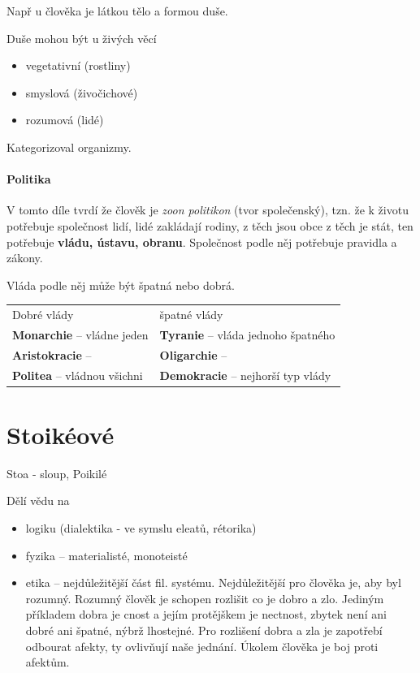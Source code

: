\documentclass[10pt,a4paper,
twoside,%
]{report}
\begin{document}
Např u člověka je látkou tělo a formou duše.

Duše mohou být u živých věcí  \begin{itemize}
\item vegetativní (rostliny)
\item smyslová (živočichové)
\item rozumová (lidé)
\end{itemize}
Kategorizoval organizmy.

\paragraph{Politika} V tomto díle tvrdí že člověk je \emph{zoon politikon} (tvor společenský), tzn. že k životu potřebuje společnost lidí, lidé zakládají rodiny, z těch jsou obce z těch je stát, ten potřebuje \textbf{vládu, ústavu, obranu}. Společnost podle něj potřebuje pravidla a zákony.

Vláda podle něj může být špatná nebo dobrá.
\begin{center}
\begin{tabular}{p{} p{}}
Dobré vlády &špatné vlády\\
\textbf{Monarchie} -- vládne jeden & \textbf{Tyranie} -- vláda jednoho špatného\\
\textbf{Aristokracie} --\dotfill & \textbf{Oligarchie} -- \dotfill\\
\textbf{Politea} -- vládnou všichni& \textbf{Demokracie} -- nejhorší typ vlády
\end{tabular}
\end{center}
\section{Stoikéové}

Stoa - sloup, Poikilé

Dělí vědu na \begin{itemize}

\item logiku (dialektika - ve symslu eleatů, rétorika)

\item fyzika -- materialisté, monoteisté

\item etika -- nejdůležitější část fil. systému. Nejdůležitější pro člověka je, aby byl rozumný. Rozumný člověk je schopen rozlišit co je dobro a zlo. Jediným příkladem dobra je cnost a jejím protějškem je nectnost, zbytek není ani dobré ani špatné, nýbrž lhostejné. Pro rozlišení dobra a zla je zapotřebí odbourat afekty, ty ovlivňují naše jednání. Úkolem člověka je boj proti afektům.

\end{itemize}
\end{document}
